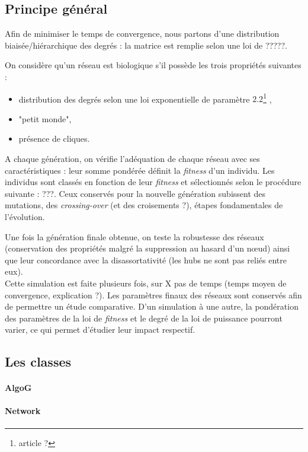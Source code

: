 \subsection{Principe général}
Afin de minimiser le temps de convergence, nous partons d'une distribution biaisée/hiérarchique des degrés : la matrice est remplie selon une loi de ?????.

On considère qu'un réseau est biologique s'il possède les trois propriétés suivantes :
\begin{itemize}
\item distribution des degrés selon une loi exponentielle de paramètre $2.2$\footnote{article ?} ,
\item "petit monde",
\item présence de cliques.
\end{itemize} 

A chaque génération, on vérifie l'adéquation de chaque réseau avec ses caractéristiques : leur somme pondérée définit la \textit{fitness} d'un individu. Les individus sont classés en fonction de leur \textit{fitness} et sélectionnés selon le procédure suivante : ???. Ceux conservés pour la nouvelle génération subissent des mutations, des \textit{crossing-over} (et des croisements ?), étapes fondamentales de l'évolution.

Une fois la génération finale obtenue, on teste la robustesse des réseaux (conservation des propriétés malgré la suppression au hasard d'un nœud) ainsi que leur concordance avec la disassortativité (les hubs ne sont pas reliés entre eux).\\

Cette simulation est faite plusieurs fois, sur X pas de temps (temps moyen de convergence, explication ?). Les paramètres finaux des réseaux sont conservés afin de permettre un étude comparative. D'un simulation à une autre, la pondération des paramètres de la loi de \textit{fitness} et le degré de la loi de puissance pourront varier, ce qui permet d'étudier leur impact respectif.

\subsection{Les classes}
\paragraph*{AlgoG}
\paragraph*{Network}




